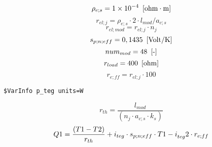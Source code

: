 \documentclass[10pt,fleqn]{article}
\newcommand{\V}[1]{\mbox{$ #1 $}}
\begin{document}
{\color{blue} \rm}
\begin{equation}
\label{EES Eqn:10}
\rho_{e;s} = 1\times 10^{-4}     \   \left[ \rm ohm\cdot m \right] 
\end{equation}
{\color{blue} \rm}
\begin{equation}
\label{EES Eqn:11}
r_{el;j} = \rho_{e;s} \cdot  2 \cdot  l_{mod}/a_{c;s} 
\end{equation}
\begin{equation}
\label{EES Eqn:12}
r_{el;mod} = r_{el;j} \cdot  n_{j} 
\end{equation}
\begin{equation}
\label{EES Eqn:13}
s_{p;n;eff} = 0,1435   \   \left[ \rm Volt/K \right] 
\end{equation}
{\color{blue} \rm}
\begin{equation}
\label{EES Eqn:14}
\V{num} _{mod}= 48   \   \left[ \rm  \mbox{-} \right] 
\end{equation}
{\color{blue} \rm}
\begin{equation}
\label{EES Eqn:15}
r_{load} = 400   \   \left[ \rm ohm \right] 
\end{equation}
{\color{blue} \rm}
\begin{equation}
\label{EES Eqn:16}
r_{e;ff} = r_{el;j}\cdot 100 
\end{equation}
{\color{teal}\begin{verbatim}
$VarInfo p_teg units=W
\end{verbatim}}        \vspace{-0.12in}\begin{equation}
\label{EES Eqn:17}
r_{th} = \frac {l_{mod}}{  \left( n_{j} \cdot  a_{c;s} \cdot  k_{s} \right)  } 
\end{equation}
\begin{equation}
\label{EES Eqn:18}
\V{Q1}  = \frac { \left( \V{T1}  - \V{T2}  \right) }{ r_{th} }+ i_{teg} \cdot  s_{p;n;eff} \cdot  \V{T1}  - i_{teg} ^{} 2 \cdot  r_{e;ff} 
\end{equation}
\end{document}
